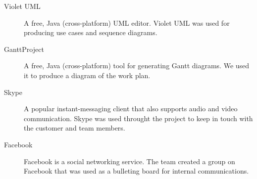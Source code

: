 \begin{description}
\item[Violet UML]
A free, Java (cross-platform) UML editor. Violet UML was used for producing use cases and sequence diagrams.

\item[GanttProject]
A free, Java (cross-platform) tool for generating Gantt diagrams. We used it to produce a diagram of the work plan.

\item[Skype]
A popular instant-messaging client that also supports audio and video communication.
Skype was used throught the project to keep in touch with the customer and team members.

\item[Facebook]
Facebook is a social networking service. The team created a group on Facebook that was used as a bulleting board for internal communications.


\end{description}


